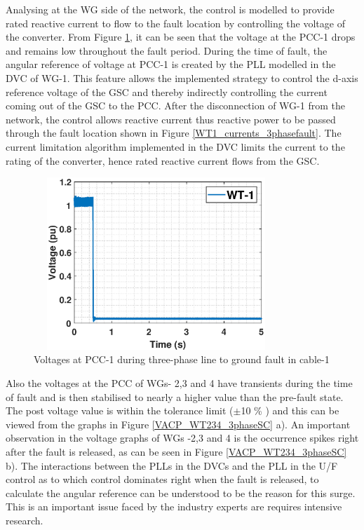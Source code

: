 Analysing at the \gls{WG} side of the network, the control is modelled to provide rated reactive current to flow to the fault location by controlling the voltage of the converter. From Figure \ref{WT1_voltages_3phasefault}, it can be seen that the voltage at the \gls{PCC}-1 drops and remains low throughout the fault period. During the time of fault, the angular reference of voltage at \gls{PCC}-1 is created by the \gls{PLL} modelled in the \gls{DVC} of \gls{WG}-1. This feature allows the implemented strategy to control the d-axis reference voltage of the \gls{GSC} and thereby indirectly controlling the current coming out of the \gls{GSC} to the \gls{PCC}. After the disconnection of \gls{WG}-1 from the network, the control allows reactive current thus reactive power to be passed through the fault location shown in Figure \ref{WT1_currents_3phasefault}. The current limitation algorithm implemented in the \gls{DVC} limits the current to the rating of the converter, hence rated reactive current flows from the \gls{GSC}.   
\begin{figure}[H]
\centering
    \includegraphics[height = 6.5cm,width = 9.25cm]{Diagrams/Chapter_5/VACP_WT1_3phaseSC.eps}
    \caption{Voltages at PCC-1 during three-phase line to ground fault in cable-1}
    \label{WT1_voltages_3phasefault}
\end{figure}

Also the voltages at the \gls{PCC} of \gls{WG}s- 2,3 and 4 have transients during the time of fault and is then stabilised to nearly a higher value than the pre-fault state. The post voltage value is within the tolerance limit ($\pm$10 \% ) and this can be viewed from the graphs in Figure \ref{VACP_WT234_3phaseSC} a). An important observation in the voltage graphs of \gls{WG}s -2,3 and 4 is the occurrence spikes right after the fault is released, as can be seen in Figure \ref{VACP_WT234_3phaseSC} b). The interactions between the \gls{PLL}s in the \gls{DVC}s and the \gls{PLL} in the U/F control as to which control dominates right when the fault is released, to calculate the angular reference can be understood to be the reason for this surge. This is an important issue faced by the industry experts are requires intensive research.

